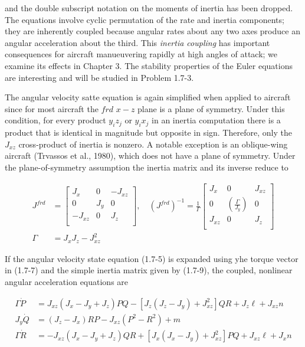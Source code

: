     and the double subscript notation on the moments of inertia has been dropped. The equations involve cyclic permutation of the rate and inertia components; they are inherently coupled because angular rates about any two axes produce an angular acceleration about the third. This \emph{inertia coupling} has important consequences for aircraft manueuvering rapidly at high angles of attack; we examine its effects in Chapter 3. The stability properties of the Euler equations are interesting and will be studied in Problem 1.7-3.

    The angular velocity satte equation is again simplified when applied to aircraft since for most aircraft the \(frd\) \(x-z\) plane is a plane of symmetry. Under this condition, for every product \(y_{i} z_{j}\) or \(y_{i} x_{j}\) in an inertia computation there is a product that is identical in magnitude but opposite in sign. Therefore, only the \(J_{xz}\) cross-product of inertia is nonzero. A notable exception is an oblique-wing aircraft (Trvassos et al., 1980), which does not have a plane of symmetry. Under the plane-of-symmetry assumption the inertia matrix and its inverse reduce to

    \begin{align*}\tag{1.7-8}
    J^{frd} &=
    \begin{bmatrix}
         J_{x}   & 0         & -J_{xz}    \\
         0       & J_{y}     &  0         \\
        -J_{xz}  & 0         &  J_{z}     \\
    \end{bmatrix}
    ,\quad
    {\left(J^{frd}\right)}^{-1} = \frac{1}{\Gamma}
    \begin{bmatrix}
         J_{x}   & 0         &  J_{xz}    \\
         0       &\left(\frac{\Gamma}{J_{y}}\right)     &  0         \\
         J_{xz}  & 0         &  J_{z}     \\
    \end{bmatrix} \\
    \Gamma &= J_{x} J_{z} - J^{2}_{xz}
\end{align*}

If the angular velocity state equation (1.7-5) is expanded using yhe torque vector in (1.7-7) and the simple inertia matrix given by (1.7-9), the coupled, nonlinear angular acceleration equations are

\begin{align*}\tag{1.7-10}
    \Gamma \dot{P} &=  J_{xz} \left( J_{x} - J_{y} + J_{z} \right) P Q - \left[ J_{z} \left( J_{z} - J_{y} \right) + J^{2}_{xz} \right] Q R + J_{z} \ell + J_{xz}n \\
J_{y} \dot{Q} &= \left( J_{z} - J_{x} \right) R P - J_{xz} \left( P^{2} - R^{2} \right) + m \\
    \Gamma \dot{R} &= -J_{xz} \left( J_{x} - J_{y} + J_{z} \right) Q R + \left[ J_{x} \left( J_{x} - J_{y} \right) + J^{2}_{xz} \right] P Q + J_{xz} \ell + J_{x}n \\
\end{align*}

